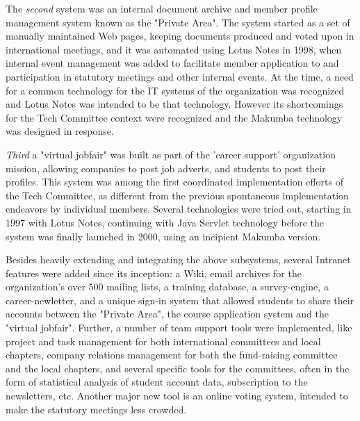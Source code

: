 \documentclass{acm_proc_article-sp}
\begin{document}
The {\it second} system was an internal document archive and member profile management system known as the "Private Area". The system started as a set of manually maintained Web pages, keeping documents produced and voted upon in international meetings, and it was automated using Lotus Notes in 1998, when internal event management was added to facilitate member application to and participation in statutory meetings and other internal events. At the time, a need for a common technology for the IT systems of the organization was recognized and Lotus Notes was intended to be that technology. However its shortcomings for the Tech Committee context were recognized and the Makumba technology was designed in response.

{\it Third} a "virtual jobfair" was built as part of the 'career support' organization mission,  allowing companies to post job adverts, and students to post their profiles. This system was among the first coordinated implementation efforts of the Tech Committee, as different from the previous spontaneous implementation endeavors by individual members. Several technologies were tried out, starting in 1997 with Lotus Notes, continuing with Java Servlet technology before the system was finally launched in 2000, using an incipient Makumba version.

Besides heavily extending and integrating the above subsystems, several Intranet features were added since its inception: a Wiki, email archives for the organization's over 500 mailing lists, a training database, a survey-engine, a career-newletter, and a unique sign-in system that allowed students to share their accounts between the "Private Area", the course application system and the "virtual jobfair". Further, a number of team support tools were implemented, like project and task management for both international committees and local chapters, company relations management for both the fund-raising committee and the local chapters, and several specific tools for the committees, often in the form of statistical analysis of student account data, subscription to the newsletters, etc. Another major new tool is an online voting system, intended to make the statutory meetings less crowded.
\end{document}
